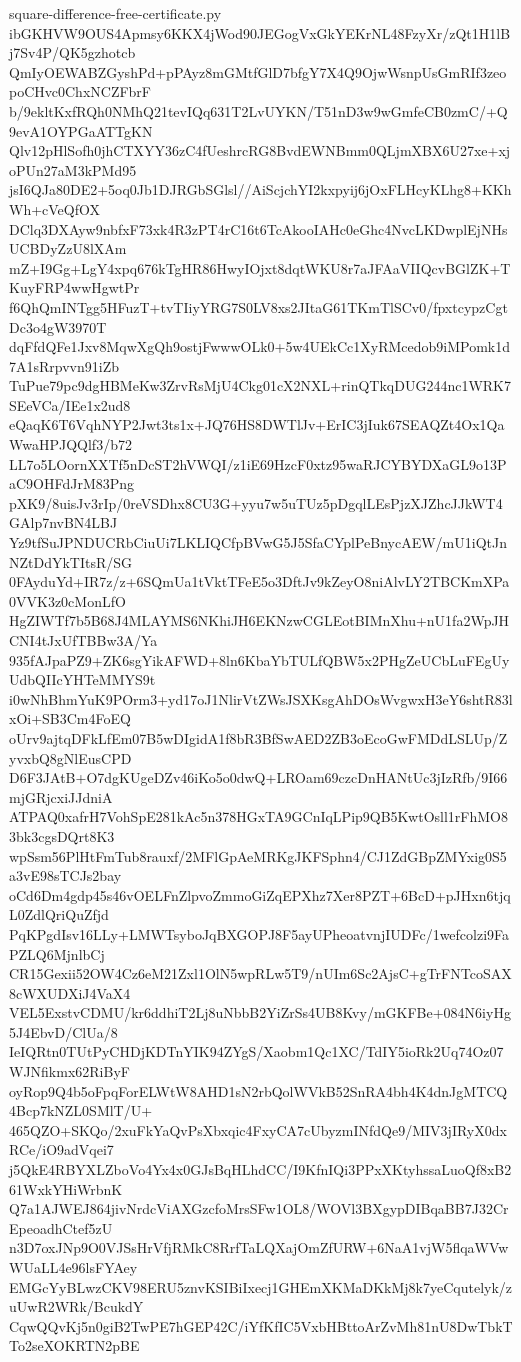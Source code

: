 \documentclass[11pt]{article}
\theoremstyle{definition}
\theoremstyle{remark}
\begin{document}
\begin{filecontents*}[overwrite]{square-difference-free-certificate.py}
ibGKHVW9OUS4Apmsy6KKX4jWod90JEGogVxGkYEKrNL48FzyXr/zQt1H1lBj7Sv4P/QK5gzhotcb
QmIyOEWABZGyshPd+pPAyz8mGMtfGlD7bfgY7X4Q9OjwWsnpUsGmRIf3zeopoCHvc0ChxNCZFbrF
b/9ekltKxfRQh0NMhQ21tevIQq631T2LvUYKN/T51nD3w9wGmfeCB0zmC/+Q9evA1OYPGaATTgKN
Qlv12pHlSofh0jhCTXYY36zC4fUeshrcRG8BvdEWNBmm0QLjmXBX6U27xe+xjoPUn27aM3kPMd95
jsI6QJa80DE2+5oq0Jb1DJRGbSGlsl//AiScjchYI2kxpyij6jOxFLHcyKLhg8+KKhWh+cVeQfOX
DClq3DXAyw9nbfxF73xk4R3zPT4rC16t6TcAkooIAHc0eGhc4NvcLKDwplEjNHsUCBDyZzU8lXAm
mZ+I9Gg+LgY4xpq676kTgHR86HwyIOjxt8dqtWKU8r7aJFAaVIIQcvBGlZK+TKuyFRP4wwHgwtPr
f6QhQmINTgg5HFuzT+tvTIiyYRG7S0LV8xs2JItaG61TKmTlSCv0/fpxtcypzCgtDc3o4gW3970T
dqFfdQFe1Jxv8MqwXgQh9ostjFwwwOLk0+5w4UEkCc1XyRMcedob9iMPomk1d7A1sRrpvvn91iZb
TuPue79pc9dgHBMeKw3ZrvRsMjU4Ckg01cX2NXL+rinQTkqDUG244nc1WRK7SEeVCa/IEe1x2ud8
eQaqK6T6VqhNYP2Jwt3ts1x+JQ76HS8DWTlJv+ErIC3jIuk67SEAQZt4Ox1QaWwaHPJQQlf3/b72
LL7o5LOornXXTf5nDcST2hVWQI/z1iE69HzcF0xtz95waRJCYBYDXaGL9o13PaC9OHFdJrM83Png
pXK9/8uisJv3rIp/0reVSDhx8CU3G+yyu7w5uTUz5pDgqlLEsPjzXJZhcJJkWT4GAlp7nvBN4LBJ
Yz9tfSuJPNDUCRbCiuUi7LKLIQCfpBVwG5J5SfaCYplPeBnycAEW/mU1iQtJnNZtDdYkTItsR/SG
0FAyduYd+IR7z/z+6SQmUa1tVktTFeE5o3DftJv9kZeyO8niAlvLY2TBCKmXPa0VVK3z0cMonLfO
HgZIWTf7b5B68J4MLAYMS6NKhiJH6EKNzwCGLEotBIMnXhu+nU1fa2WpJHCNI4tJxUfTBBw3A/Ya
935fAJpaPZ9+ZK6sgYikAFWD+8ln6KbaYbTULfQBW5x2PHgZeUCbLuFEgUyUdbQIIcYHTeMMYS9t
i0wNhBhmYuK9POrm3+yd17oJ1NlirVtZWsJSXKsgAhDOsWvgwxH3eY6shtR83lxOi+SB3Cm4FoEQ
oUrv9ajtqDFkLfEm07B5wDIgidA1f8bR3BfSwAED2ZB3oEcoGwFMDdLSLUp/ZyvxbQ8gNlEusCPD
D6F3JAtB+O7dgKUgeDZv46iKo5o0dwQ+LROam69czcDnHANtUc3jIzRfb/9I66mjGRjcxiJJdniA
ATPAQ0xafrH7VohSpE281kAc5n378HGxTA9GCnIqLPip9QB5KwtOsll1rFhMO83bk3cgsDQrt8K3
wpSsm56PlHtFmTub8rauxf/2MFlGpAeMRKgJKFSphn4/CJ1ZdGBpZMYxig0S5a3vE98sTCJs2bay
oCd6Dm4gdp45s46vOELFnZlpvoZmmoGiZqEPXhz7Xer8PZT+6BcD+pJHxn6tjqL0ZdlQriQuZfjd
PqKPgdIsv16LLy+LMWTsyboJqBXGOPJ8F5ayUPheoatvnjIUDFc/1wefcolzi9FaPZLQ6MjnlbCj
CR15Gexii52OW4Cz6eM21Zxl1OlN5wpRLw5T9/nUIm6Sc2AjsC+gTrFNTcoSAX8cWXUDXiJ4VaX4
VEL5ExstvCDMU/kr6ddhiT2Lj8uNbbB2YiZrSs4UB8Kvy/mGKFBe+084N6iyHg5J4EbvD/ClUa/8
IeIQRtn0TUtPyCHDjKDTnYIK94ZYgS/Xaobm1Qc1XC/TdIY5ioRk2Uq74Oz07WJNfikmx62RiByF
oyRop9Q4b5oFpqForELWtW8AHD1sN2rbQolWVkB52SnRA4bh4K4dnJgMTCQ4Bcp7kNZL0SMlT/U+
465QZO+SKQo/2xuFkYaQvPsXbxqic4FxyCA7cUbyzmINfdQe9/MIV3jIRyX0dxRCe/iO9adVqei7
j5QkE4RBYXLZboVo4Yx4x0GJsBqHLhdCC/I9KfnIQi3PPxXKtyhssaLuoQf8xB261WxkYHiWrbnK
Q7a1AJWEJ864jivNrdcViAXGzcfoMrsSFw1OL8/WOVl3BXgypDIBqaBB7J32CrEpeoadhCtef5zU
n3D7oxJNp9O0VJSsHrVfjRMkC8RrfTaLQXajOmZfURW+6NaA1vjW5flqaWVwWUaLL4e96lsFYAey
EMGcYyBLwzCKV98ERU5znvKSIBiIxecj1GHEmXKMaDKkMj8k7yeCqutelyk/zuUwR2WRk/BcukdY
CqwQQvKj5n0giB2TwPE7hGEP42C/iYfKfIC5VxbHBttoArZvMh81nU8DwTbkTTo2seXOKRTN2pBE

\end{filecontents*}
\end{document}
